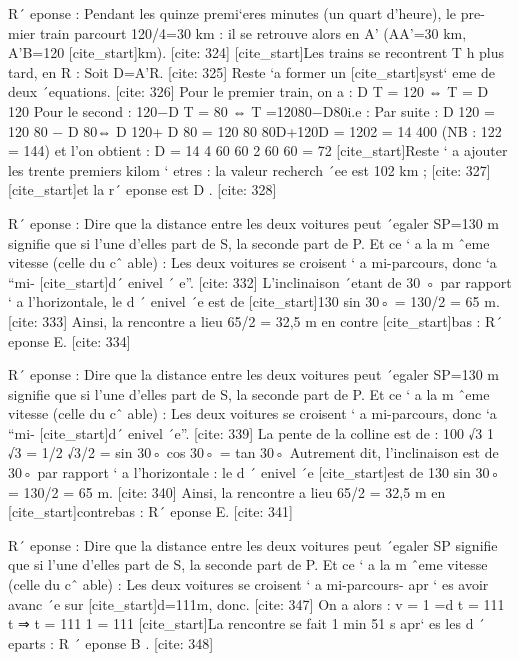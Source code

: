 R´ eponse : Pendant les quinze premi`eres minutes (un quart d’heure), le pre- 
 mier train parcourt 120/4=30 km : il se retrouve alors en A’ (AA’=30 km, A’B=120
 [cite_start]km). [cite: 324]
[cite_start]Les trains se recontrent T h plus tard, en R : Soit D=A’R. [cite: 325]
Reste `a former un 
 [cite_start]syst` eme de deux ´equations. [cite: 326]
Pour le premier train, on a : 
 D
 T
 = 120 ⇔ T =
 D
 120
 Pour le second :
 120−D
 T
 = 80 ⇔ T =12080−D80i.e :
 Par suite :
 D
 120
 =
 120
 80
 −
 D
 80⇔
 D
 120+
 D
 80
 =
 120
 80
 80D+120D = 1202 = 14 400 (NB : 122 = 144)
 et l’on obtient :
 D =
 14 4 60 60
 2 60 60
 = 72
 [cite_start]Reste ` a ajouter les trente premiers kilom ` etres : la valeur recherch ´ee est 102 km ; [cite: 327]
[cite_start]et la r´ eponse est D . [cite: 328]

R´ eponse : Dire que la distance entre les deux voitures peut ´egaler SP=130 
 m signifie que si l’une d’elles part de S, la seconde part de P. Et ce ` a la m ˆeme 
 vitesse (celle du cˆ able) : Les deux voitures se croisent ` a mi-parcours, donc `a “mi- 
 [cite_start]d´ enivel ´ e”. [cite: 332]
L’inclinaison ´etant de 30 ◦ par rapport ` a l’horizontale, le d ´ enivel ´e est de 
 [cite_start]130 sin 30◦ = 130/2 = 65 m. [cite: 333]
Ainsi, la rencontre a lieu 65/2 = 32,5 m en contre 
 [cite_start]bas : R´ eponse E. [cite: 334]

R´ eponse : Dire que la distance entre les deux voitures peut ´egaler SP=130 
 m signifie que si l’une d’elles part de S, la seconde part de P. Et ce ` a la m ˆeme 
 vitesse (celle du cˆ able) : Les deux voitures se croisent ` a mi-parcours, donc `a “mi- 
 [cite_start]d´ enivel ´e”. [cite: 339]
La pente de la colline est de : 
 100
 √3%
 1
 √3
 =
 1/2
 √3/2
 =
 sin 30◦
 cos 30◦
 = tan 30◦
 Autrement dit, l’inclinaison est de 30◦ par rapport ` a l’horizontale : le d ´ enivel ´e
 [cite_start]est de 130 sin 30◦ = 130/2 = 65 m. [cite: 340]
Ainsi, la rencontre a lieu 65/2 = 32,5 m en
 [cite_start]contrebas : R´ eponse E. [cite: 341]

R´ eponse : Dire que la distance entre les deux voitures peut ´egaler SP signifie 
 que si l’une d’elles part de S, la seconde part de P. Et ce ` a la m ˆeme vitesse (celle 
 du cˆ able) : Les deux voitures se croisent ` a mi-parcours- apr ` es avoir avanc ´e sur 
 [cite_start]d=111m, donc. [cite: 347]
On a alors :
 v = 1 =d
 t
 =
 111
 t
 ⇒ t =
 111
 1
 = 111
 [cite_start]La rencontre se fait 1 min 51 s apr` es les d ´ eparts : R ´ eponse B . [cite: 348]

